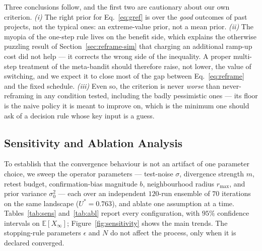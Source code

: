 \documentclass[11pt]{article}
\newcommand{\E}{\mathbb{E}}
\begin{document}
Three conclusions follow, and the first two are cautionary about our own criterion. \emph{(i)} The right prior for Eq.~\eqref{eq:gref} is over the \emph{good} outcomes of past projects, not the typical ones: an extreme-value prior, not a mean prior. \emph{(ii)} The myopia of the one-step rule lives on the benefit side, which explains the otherwise puzzling result of Section~\ref{sec:reframe-sim} that charging an additional ramp-up cost did not help --- it corrects the wrong side of the inequality. A proper multi-step treatment of the meta-bandit should therefore raise, not lower, the value of switching, and we expect it to close most of the gap between Eq.~\eqref{eq:reframe} and the fixed schedule. \emph{(iii)} Even so, the criterion is never \emph{worse} than never-reframing in any condition tested, including the badly pessimistic ones --- its floor is the naive policy it is meant to improve on, which is the minimum one should ask of a decision rule whose key input is a guess.

\subsection{Sensitivity and Ablation Analysis}
\label{sec:sweep}

To establish that the convergence behaviour is not an artifact of one parameter choice, we sweep the operator parameters --- test-noise $\sigma$, divergence strength $m$, retest budget, confirmation-bias magnitude $b$, neighbourhood radius $r_{\max}$, and prior variance $\sigma_0^2$ --- each over an independent $120$-run ensemble of $70$ iterations on the same landscape ($U^*=0.763$), and ablate one assumption at a time. Tables~\ref{tab:sens} and~\ref{tab:abl} report every configuration, with $95\%$ confidence intervals on $\E[X_\infty]$; Figure~\ref{fig:sensitivity} shows the main trends. The stopping-rule parameters $\epsilon$ and $N$ do not affect the process, only when it is declared converged.
\end{document}
